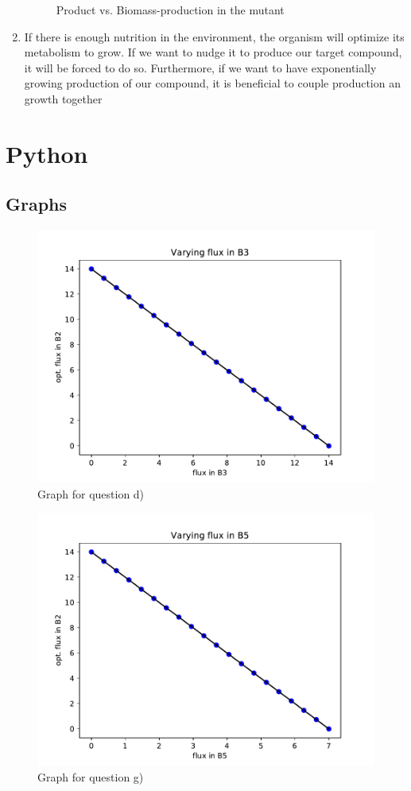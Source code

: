 \documentclass{scrartcl}
\begin{document}
\begin{enumerate}
\begin{figure}[H]
				\caption{Product vs. Biomass-production in the mutant}
			\end{figure}
		\item If there is enough nutrition in the environment, the organism will optimize its metabolism to grow. If we want to nudge it to produce our target compound, it will be forced to do so. 
			Furthermore, if we want to have exponentially growing production of our compound, it is beneficial to couple production an growth together
	\end{enumerate}
\section{Python}
    
	\subsection{Graphs}
		\begin{figure}[H]
			\centering
			\includegraphics[max width=0.8\linewidth]{Program/Figure_1.pdf}
			\caption{Graph for question d)}
		\end{figure}
		\begin{figure}[H]
			\centering
	     		\includegraphics[max width=0.8\linewidth]{Program/Figure_2.pdf}
			\caption{Graph for question g)}
		\end{figure}
\end{document}
